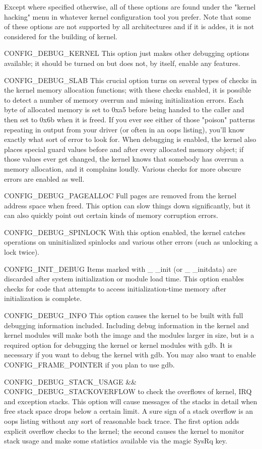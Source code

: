 \documentclass{masterthesis}
\begin{document}
\begin{itemize}
Except where specified otherwise, all of these options are found under the "kernel hacking" menu in whatever kernel configuration tool you prefer. Note that some of these options are not supported by all architectures and if it is addes, it is not considered for the building of kernel.

CONFIG_DEBUG_KERNEL
This option just makes other debugging options available; it should be turned on but does not, by itself, enable any features.

CONFIG_DEBUG_SLAB
This crucial option turns on several types of checks in the kernel memory allocation functions; with these checks enabled, it is possible to detect a number of memory overrun and missing initialization errors. Each byte of allocated memory is set to 0xa5 before being handed to the caller and then set to 0x6b when it is freed. If you ever see either of those "poison" patterns repeating in output from your driver (or often in an oops listing), you'll know exactly what sort of error to look for. When debugging is enabled, the kernel also places special guard values before and after every allocated memory object; if those values ever get changed, the kernel knows that somebody has overrun a memory allocation, and it complains loudly. Various checks for more obscure errors are enabled as well.

CONFIG_DEBUG_PAGEALLOC
Full pages are removed from the kernel address space when freed. This option can slow things down significantly, but it can also quickly point out certain kinds of memory corruption errors.

CONFIG_DEBUG_SPINLOCK
With this option enabled, the kernel catches operations on uninitialized spinlocks and various other errors (such as unlocking a lock twice).

CONFIG_INIT_DEBUG
Items marked with _ _init (or _ _initdata) are discarded after system initialization or module load time. This option enables checks for code that attempts to access initialization-time memory after initialization is complete.


CONFIG_DEBUG_INFO
This option causes the kernel to be built with full debugging information included. Including debug information in the kernel and kernel modules will make both the image and the modules larger in size, but is a required option for debugging the kernel or kernel modules with gdb.
It is necessary if you want to debug the kernel with gdb.
You may also want to enable CONFIG_FRAME_POINTER if you plan to use gdb.

 
CONFIG_DEBUG_STACK_USAGE && CONFIG_DEBUG_STACKOVERFLOW
to check the overflows of kernel, IRQ and exception stacks. This option will cause messages of the stacks in detail when free stack space drops below a certain limit.
A sure sign of a stack overflow is an oops listing without any sort of reasonable back trace. The first option adds explicit overflow checks to the kernel; the second causes the kernel to monitor stack usage and make some statistics available via the magic SysRq key.


\end{itemize}
\end{document}
